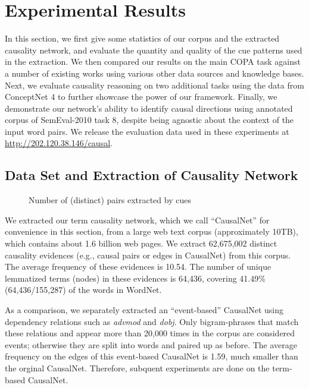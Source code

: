 \section{Experimental Results}
\label{sec:eval} 
In this section, we first give some statistics of
our corpus and the extracted causality network, and evaluate the
quantity and quality of the cue patterns used in the extraction. 
We then compared our results on the main COPA task against a number of
existing works using various other data sources and knowledge bases.
Next, we evaluate causality reasoning
on two additional tasks using the data from ConceptNet 4 to
further showcase the power of our framework.
Finally, we demonstrate our network's ability to identify causal directions
using annotated corpus of SemEval-2010 task 8, despite being
agnostic about the context of the input word pairs.
We release the evaluation data used in these experiments 
at \url{http://202.120.38.146/causal}.

\subsection{Data Set and Extraction of Causality Network}
\label{sec:causalnet}
\begin{figure}[th]
\centering
{}
\caption{Number of (distinct) pairs extracted by cues}
\label{fig:pattern1}
\end{figure}
We extracted our term causality network, which we call ``CausalNet''
for convenience in this section, from a large web text corpus (approximately
10TB), %
which contains about 1.6 billion web pages.
We extract 62,675,002 distinct causality evidences (e.g., causal pairs
or edges in CausalNet) from this corpus. 
The average frequency of these evidences is 10.54.
The number of unique lemmatized terms (nodes)
in these evidences is 64,436, covering 41.49\% (64,436/155,287) of the
words in WordNet. 

As a comparison, we separately extracted an 
``event-based'' CausalNet using dependency relations 
such as \emph{advmod} and \emph{dobj}. 
Only bigram-phrases that match these relations and appear more than
20,000 times in the corpus are considered events; otherwise they are split
into words and paired up as before. 
The average frequency on the edges of this event-based CausalNet
is 1.59, much smaller than the orginal CausalNet. Therefore, subquent 
experiments are done on the term-based CausalNet.


